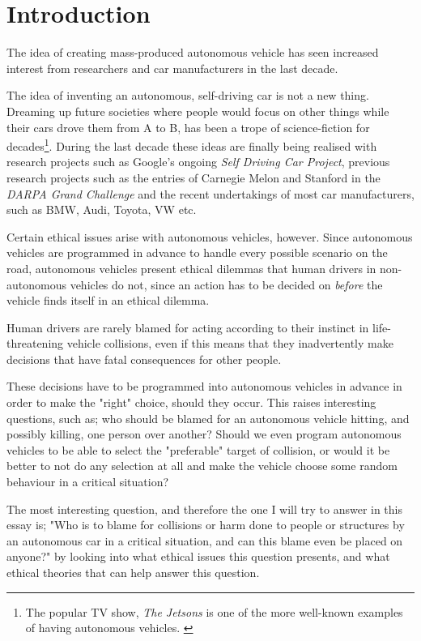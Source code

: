 \chapter{Introduction}

\newpar The idea of creating mass-produced autonomous vehicle has seen increased interest from researchers and car manufacturers in the last decade.

The idea of inventing an autonomous, self-driving car is not a new thing. Dreaming up future societies where people would focus on other things while their cars drove them from A to B, has been a trope of science-fiction for decades\footnote{The popular TV show, \textit{The Jetsons} is one of the more well-known examples of having autonomous vehicles. \cite{wiki:jetsons}}. During the last decade these ideas are finally being realised with research projects such as Google's ongoing \textit{Self Driving Car Project}, previous research projects such as the entries of Carnegie Melon and Stanford in the \textit{DARPA Grand Challenge} \cite{wiki:darpachallenge} and the recent undertakings of most car manufacturers, such as BMW, Audi, Toyota, VW etc. \cite{forbes:timeline}

\newpar Certain ethical issues arise with autonomous vehicles, however. Since autonomous vehicles are programmed in advance to handle every possible scenario on the road, autonomous vehicles present ethical dilemmas that human drivers in non-autonomous vehicles do not, since an action has to be decided on \textit{before} the vehicle finds itself in an ethical dilemma. 

\newpar Human drivers are rarely blamed for acting according to their instinct in life-threatening vehicle collisions, even if this means that they inadvertently make decisions that have fatal consequences for other people. 

These decisions have to be programmed into autonomous vehicles in advance in order to make the "right" choice, should they occur. 
This raises interesting questions, such as; who should be blamed for an autonomous vehicle hitting, and possibly killing, one person over another? Should we even program autonomous vehicles to be able to select the "preferable" target of collision, or would it be better to not do any selection at all and make the vehicle choose some random behaviour in a critical situation?

The most interesting question, and therefore the one I will try to answer in this essay is; "Who is to blame for collisions or harm done to people or structures by an autonomous car in a critical situation, and can this blame even be placed on anyone?" by looking into what ethical issues this question presents, and what ethical theories that can help answer this question.

 

